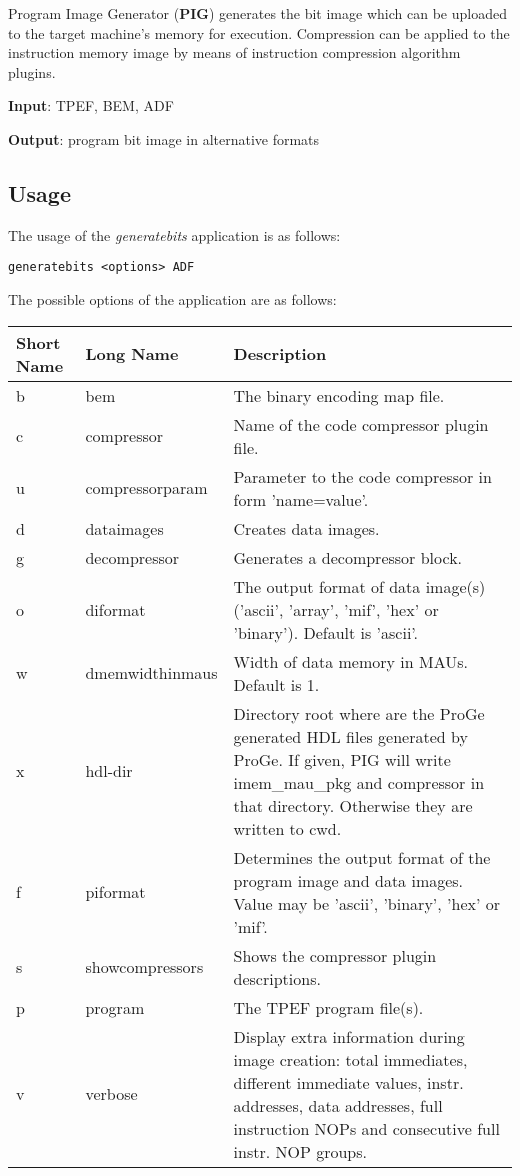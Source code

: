 \documentclass[twoside]{tceusermanual}
\begin{document}
Program Image Generator (\textbf{PIG}) generates the bit image which can be
uploaded to the target machine's memory for execution. Compression can be
applied to the instruction memory image by means of instruction compression
algorithm plugins.

\textbf{Input}: TPEF, BEM, ADF

\textbf{Output}: program bit image in alternative formats

\subsection{Usage}

The usage of the \emph{generatebits} application is as follows:

\begin{verbatim}
generatebits <options> ADF
\end{verbatim}

The possible options of the application are as follows:\\

\begin{tabular}{p{}p{}
                p{}}
\textbf{Short Name} &\textbf{Long Name} &\textbf{Description} \\
\hline
b & bem         & The binary encoding map file.\\
c & compressor  & Name of the code compressor plugin file.\\
u & compressorparam & Parameter to the code compressor in form 'name=value'. \\
d & dataimages  & Creates data images.\\
g & decompressor & Generates a decompressor block. \\
o & diformat & The output format of data image(s) ('ascii', 'array', 'mif', 
'hex' or 'binary'). Default is 'ascii'. \\
w & dmemwidthinmaus & Width of data memory in MAUs. Default is 1. \\
x & hdl-dir & Directory root where are the ProGe generated HDL files
generated by ProGe. If given, PIG will write imem\_mau\_pkg and compressor
in that directory. Otherwise they are written to cwd.\\
f & piformat & Determines the output format of the program image and data
images. Value may be 'ascii', 'binary', 'hex' or 'mif'.\\
s & showcompressors & Shows the compressor plugin descriptions. \\
p & program & The TPEF program file(s).\\
v & verbose & Display extra information during image creation: total 
immediates, different immediate values, instr. addresses, data addresses,
full instruction NOPs and consecutive full instr. NOP groups.\\
\end{tabular}\\
\end{document}
